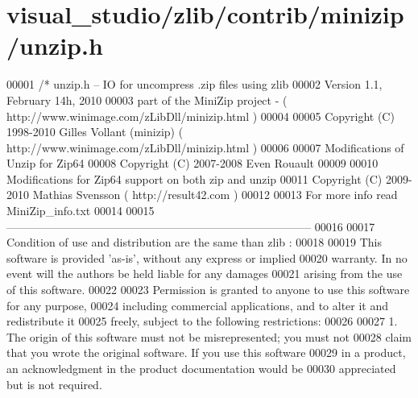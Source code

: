 \hypertarget{visual__studio_2zlib_2contrib_2minizip_2unzip_8h_source}{}\section{visual\+\_\+studio/zlib/contrib/minizip/unzip.h}
\label{visual__studio_2zlib_2contrib_2minizip_2unzip_8h_source}

\begin{DoxyCode}
00001 \textcolor{comment}{/* unzip.h -- IO for uncompress .zip files using zlib}
00002 \textcolor{comment}{   Version 1.1, February 14h, 2010}
00003 \textcolor{comment}{   part of the MiniZip project - ( http://www.winimage.com/zLibDll/minizip.html )}
00004 \textcolor{comment}{}
00005 \textcolor{comment}{         Copyright (C) 1998-2010 Gilles Vollant (minizip) ( http://www.winimage.com/zLibDll/minizip.html )}
00006 \textcolor{comment}{}
00007 \textcolor{comment}{         Modifications of Unzip for Zip64}
00008 \textcolor{comment}{         Copyright (C) 2007-2008 Even Rouault}
00009 \textcolor{comment}{}
00010 \textcolor{comment}{         Modifications for Zip64 support on both zip and unzip}
00011 \textcolor{comment}{         Copyright (C) 2009-2010 Mathias Svensson ( http://result42.com )}
00012 \textcolor{comment}{}
00013 \textcolor{comment}{         For more info read MiniZip\_info.txt}
00014 \textcolor{comment}{}
00015 \textcolor{comment}{         ---------------------------------------------------------------------------------}
00016 \textcolor{comment}{}
00017 \textcolor{comment}{        Condition of use and distribution are the same than zlib :}
00018 \textcolor{comment}{}
00019 \textcolor{comment}{  This software is provided 'as-is', without any express or implied}
00020 \textcolor{comment}{  warranty.  In no event will the authors be held liable for any damages}
00021 \textcolor{comment}{  arising from the use of this software.}
00022 \textcolor{comment}{}
00023 \textcolor{comment}{  Permission is granted to anyone to use this software for any purpose,}
00024 \textcolor{comment}{  including commercial applications, and to alter it and redistribute it}
00025 \textcolor{comment}{  freely, subject to the following restrictions:}
00026 \textcolor{comment}{}
00027 \textcolor{comment}{  1. The origin of this software must not be misrepresented; you must not}
00028 \textcolor{comment}{     claim that you wrote the original software. If you use this software}
00029 \textcolor{comment}{     in a product, an acknowledgment in the product documentation would be}
00030 \textcolor{comment}{     appreciated but is not required.}

\end{DoxyCode}
